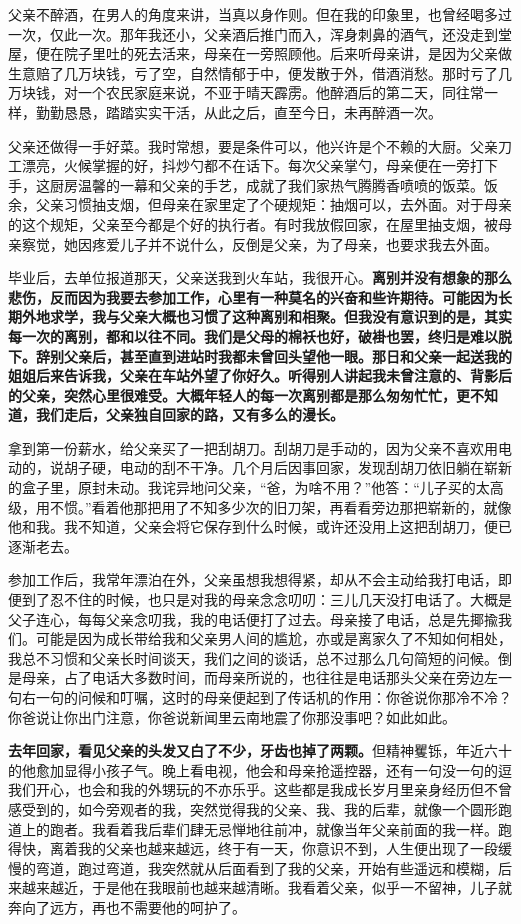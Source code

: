 \documentclass[UTF8,a4paper,8pt]{ctexbook}
\begin{document}
		父亲不醉酒，在男人的角度来讲，当真以身作则。但在我的印象里，也曾经喝多过一次，仅此一次。那年我还小，父亲酒后推门而入，浑身刺鼻的酒气，还没走到堂屋，便在院子里吐的死去活来，母亲在一旁照顾他。后来听母亲讲，是因为父亲做生意赔了几万块钱，亏了空，自然情郁于中，便发散于外，借酒消愁。那时亏了几万块钱，对一个农民家庭来说，不亚于晴天霹雳。他醉酒后的第二天，同往常一样，勤勤恳恳，踏踏实实干活，从此之后，直至今日，未再醉酒一次。
		
		父亲还做得一手好菜。我时常想，要是条件可以，他兴许是个不赖的大厨。父亲刀工漂亮，火候掌握的好，抖炒勺都不在话下。每次父亲掌勺，母亲便在一旁打下手，这厨房温馨的一幕和父亲的手艺，成就了我们家热气腾腾香喷喷的饭菜。饭余，父亲习惯抽支烟，但母亲在家里定了个硬规矩：抽烟可以，去外面。对于母亲的这个规矩，父亲至今都是个好的执行者。有时我放假回家，在屋里抽支烟，被母亲察觉，她因疼爱儿子并不说什么，反倒是父亲，为了母亲，也要求我去外面。
		
		毕业后，去单位报道那天，父亲送我到火车站，我很开心。\textbf{离别并没有想象的那么悲伤，反而因为我要去参加工作，心里有一种莫名的兴奋和些许期待。可能因为长期外地求学，我与父亲大概也习惯了这种离别和相聚。但我没有意识到的是，其实每一次的离别，都和以往不同。我们是父母的棉袄也好，破褂也罢，终归是难以脱下。辞别父亲后，甚至直到进站时我都未曾回头望他一眼。那日和父亲一起送我的姐姐后来告诉我，父亲在车站外望了你好久。听得别人讲起我未曾注意的、背影后的父亲，突然心里很难受。大概年轻人的每一次离别都是那么匆匆忙忙，更不知道，我们走后，父亲独自回家的路，又有多么的漫长。}
		
		拿到第一份薪水，给父亲买了一把刮胡刀。刮胡刀是手动的，因为父亲不喜欢用电动的，说胡子硬，电动的刮不干净。几个月后因事回家，发现刮胡刀依旧躺在崭新的盒子里，原封未动。我诧异地问父亲，“爸，为啥不用？”他答：“儿子买的太高级，用不惯。”看着他那把用了不知多少次的旧刀架，再看看旁边那把崭新的，就像他和我。我不知道，父亲会将它保存到什么时候，或许还没用上这把刮胡刀，便已逐渐老去。
		
		参加工作后，我常年漂泊在外，父亲虽想我想得紧，却从不会主动给我打电话，即便到了忍不住的时候，也只是对我的母亲念念叨叨：三儿几天没打电话了。大概是父子连心，每每父亲念叨我，我的电话便打了过去。母亲接了电话，总是先揶揄我们。可能是因为成长带给我和父亲男人间的尴尬，亦或是离家久了不知如何相处，我总不习惯和父亲长时间谈天，我们之间的谈话，总不过那么几句简短的问候。倒是母亲，占了电话大多数时间，而母亲所说的，也往往是电话那头父亲在旁边左一句右一句的问候和叮嘱，这时的母亲便起到了传话机的作用：你爸说你那冷不冷？你爸说让你出门注意，你爸说新闻里云南地震了你那没事吧？如此如此。
		
		\textbf{去年回家，看见父亲的头发又白了不少，牙齿也掉了两颗。}但精神矍铄，年近六十的他愈加显得小孩子气。晚上看电视，他会和母亲抢遥控器，还有一句没一句的逗我们开心，也会和我的外甥玩的不亦乐乎。这些都是我成长岁月里亲身经历但不曾感受到的，如今旁观者的我，突然觉得我的父亲、我、我的后辈，就像一个圆形跑道上的跑者。我看着我后辈们肆无忌惮地往前冲，就像当年父亲前面的我一样。跑得快，离着我的父亲也越来越远，终于有一天，你意识不到，人生便出现了一段缓慢的弯道，跑过弯道，我突然就从后面看到了我的父亲，开始有些遥远和模糊，后来越来越近，于是他在我眼前也越来越清晰。我看着父亲，似乎一不留神，儿子就奔向了远方，再也不需要他的呵护了。
		
\end{document}
